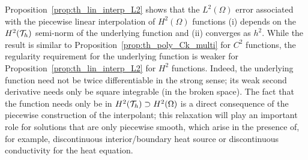 Proposition~\ref{prop:th_lin_interp_L2} shows that the $L^2(\Omega)$ error associated with the piecewise linear interpolation of $H^2(\Omega)$ functions (i) depends on the $H^2(\mathcal{T}_h)$ semi-norm of the underlying function and (ii) converges as $h^2$.  While the result is similar to Proposition~\ref{prop:th_poly_Ck_multi} for $C^2$ functions, the regularity requirement for the underlying function is weaker for Proposition~\ref{prop:th_lin_interp_L2} for $H^2$ functions.  Indeed, the underlying function need not be twice differentiable in the strong sense; its weak second derivative needs only be square integrable (in the broken space).  The fact that the function needs only be in $H^2(\mathcal{T}_h) \supset H^2(\Omega)$ is a direct consequence of the piecewise construction of the interpolant; this relaxation will play an important role for solutions that are only piecewise smooth, which arise in the presence of, for example, discontinuous interior/boundary heat source or discontinuous conductivity for the heat equation.


